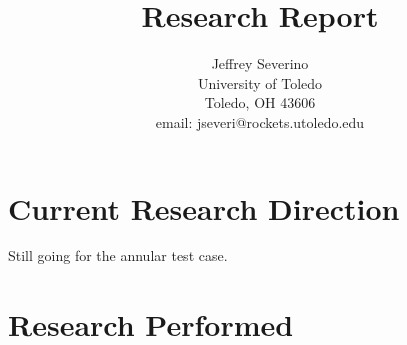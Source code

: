 \documentclass[a4paper]{article}
\begin{document}
\begin{titlepage}

    \title{
    Research Report}



    \author{ Jeffrey Severino \\
        University of Toledo \\
        Toledo, OH  43606 \\
    email: jseveri@rockets.utoledo.edu}

    \maketitle

\end{titlepage}
\section{Current Research Direction}
Still going for the annular test case.
\section{Research Performed}
\end{document}
